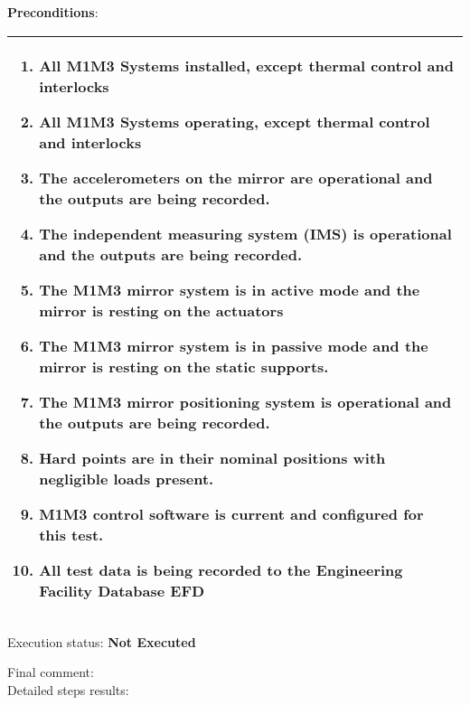 \documentclass[SE,lsstdraft,STR,toc]{lsstdoc}
\providecommand{\tightlist}{
  \setlength{\itemsep}{0pt}\setlength{\parskip}{0pt}}
\begin{document}
\textbf{ Preconditions}:\\
\begin{longtable}[]{@{}l@{}}
\toprule
\begin{minipage}[t]{0.97\columnwidth}\raggedright\strut
\begin{enumerate}
\tightlist
\item
  All M1M3 Systems installed, except thermal control and interlocks
\item
  All M1M3 Systems operating, except thermal control and interlocks
\item
  The accelerometers on the mirror are operational and the outputs are
  being recorded.
\item
  The independent measuring system (IMS) is operational and the outputs
  are being recorded.
\item
  The M1M3 mirror system is in active mode and the mirror is resting on
  the actuators
\item
  The M1M3 mirror system is in passive mode and the mirror is resting on
  the static supports.
\item
  The M1M3 mirror positioning system is operational and the outputs are
  being recorded.
\item
  Hard points are in their nominal positions with negligible loads
  present.
\item
  M1M3 control software is current and configured for this test.
\item
  All test data is being recorded to the Engineering Facility Database
  EFD
\end{enumerate}\strut
\end{minipage}\tabularnewline
\bottomrule
\end{longtable}

Execution status: {\bf Not Executed }

Final comment:\\


Detailed steps results:
\end{document}

